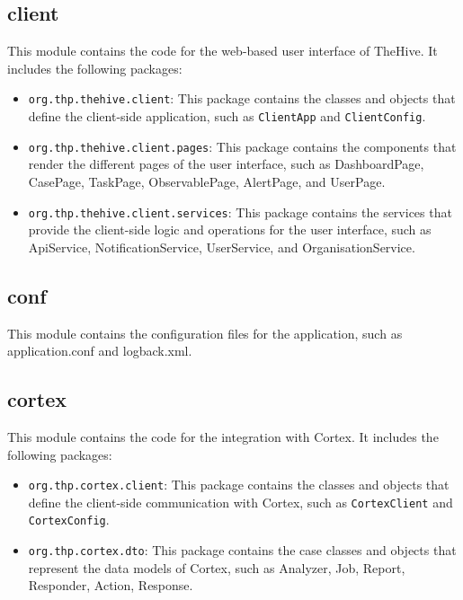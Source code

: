 \subsection{client}

This module contains the code for the web-based user interface of TheHive. It includes the following packages:

\begin{itemize}
    \item \texttt{org.thp.thehive.client}: This package contains the classes and objects that define the client-side application, such as \texttt{ClientApp} and \texttt{ClientConfig}.
    \item \texttt{org.thp.thehive.client.pages}: This package contains the components that render the different pages of the user interface, such as DashboardPage, CasePage, TaskPage, ObservablePage, AlertPage, and UserPage.
    \item \texttt{org.thp.thehive.client.services}: This package contains the services that provide the client-side logic and operations for the user interface, such as ApiService, NotificationService, UserService, and OrganisationService.
\end{itemize}

\subsection{conf}

This module contains the configuration files for the application, such as application.conf and logback.xml.

\subsection{cortex}

This module contains the code for the integration with Cortex. It includes the following packages:

\begin{itemize}
    \item \texttt{org.thp.cortex.client}: This package contains the classes and objects that define the client-side communication with Cortex, such as \texttt{CortexClient} and \texttt{CortexConfig}.
    \item \texttt{org.thp.cortex.dto}: This package contains the case classes and objects that represent the data models of Cortex, such as Analyzer, Job, Report, Responder, Action, Response.
\end{itemize}

